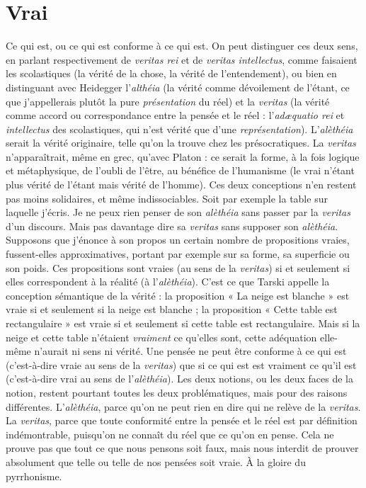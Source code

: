 \section{Vrai}
Ce qui est, ou ce qui est conforme à ce qui est. On peut distinguer ces
deux sens, en parlant respectivement de {\it veritas rei} et de {\it veritas intellectus},
comme faisaient les scolastiques (la vérité de la chose, la vérité de l’entendement),
ou bien en distinguant avec Heidegger l’{\it althéia} (la vérité comme
dévoilement de l’étant, ce que j’appellerais plutôt la pure {\it présentation} du réel)
et la {\it veritas} (la vérité comme accord ou correspondance entre la pensée et le
réel : l’{\it ad{\ae}quatio rei} et {\it intellectus} des scolastiques, qui n’est vérité que d’une
{\it représentation}). L'{\it alèthéia} serait la vérité originaire, telle qu’on la trouve chez les
présocratiques. La {\it veritas} n’apparaîtrait, même en grec, qu'avec Platon : ce
serait la forme, à la fois logique et métaphysique, de l'oubli de l’être, au bénéfice
de l’humanisme (le vrai n'étant plus vérité de l’étant mais vérité de
l’homme). Ces deux conceptions n’en restent pas moins solidaires, et même
indissociables. Soit par exemple la table sur laquelle j'écris. Je ne peux rien
penser de son {\it alèthéia} sans passer par la {\it veritas} d’un discours. Mais pas davantage
dire sa {\it veritas} sans supposer son {\it alèthéia}. Supposons que j'énonce à son
propos un certain nombre de propositions vraies, fussent-elles approximatives,
portant par exemple sur sa forme, sa superficie ou son poids. Ces propositions
sont vraies (au sens de la {\it veritas}) si et seulement si elles correspondent à la réalité
(à l'{\it alèthéia}). C’est ce que Tarski appelle la conception sémantique de la
vérité : la proposition « La neige est blanche » est vraie si et seulement si la
neige est blanche ; la proposition « Cette table est rectangulaire » est vraie si et
seulement si cette table est rectangulaire. Mais si la neige et cette table n’étaient
{\it vraiment} ce qu'elles sont, cette adéquation elle-même n’aurait ni sens ni vérité.
Une pensée ne peut être conforme à ce qui est (c’est-à-dire vraie au sens de la
{\it veritas}) que si ce qui est est vraiment ce qu'il est (c’est-à-dire vrai au sens de
l’{\it alèthéia}). Les deux notions, ou les deux faces de la notion, restent pourtant
toutes les deux problématiques, mais pour des raisons différentes. L’{\it alèthéia},
parce qu’on ne peut rien en dire qui ne relève de la {\it veritas}. La {\it veritas}, parce que
toute conformité entre la pensée et le réel est par définition indémontrable,
puisqu’on ne connaît du réel que ce qu’on en pense. Cela ne prouve pas que
tout ce que nous pensons soit faux, mais nous interdit de prouver absolument
que telle ou telle de nos pensées soit vraie. À la gloire du pyrrhonisme.

